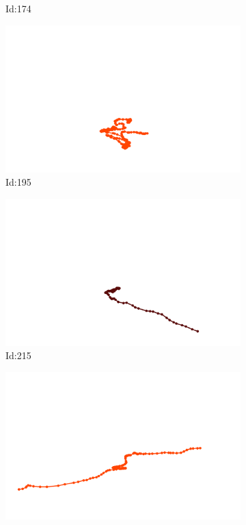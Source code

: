 \documentclass[12pt,twoside]{report}
\begin{document}
\begin{figure}
\begin{subfigure}[b]{0.20\textwidth}
\caption{Id:174}
\end{subfigure}
\begin{subfigure}[b]{0.20\textwidth}
\centering
\includegraphics[width=\textwidth]{../../trajectories/195.png}
\caption{Id:195}
\end{subfigure}
\begin{subfigure}[b]{0.20\textwidth}
\centering
\includegraphics[width=\textwidth]{../../trajectories/215.png}
\caption{Id:215}
\end{subfigure}
\begin{subfigure}[b]{0.20\textwidth}
\centering
\includegraphics[width=\textwidth]{../../trajectories/828.png}

\end{subfigure}
\end{figure}
\end{document}
